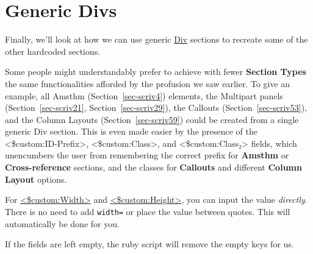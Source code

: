\documentclass[
  12pt,
  a4paper,
  oneside,
  numbers=noenddot,
  titlepage,
  toclink=all,
  toc=bibliography]{scrbook}
\theoremstyle{definition}
\theoremstyle{definition}
\theoremstyle{definition}
\theoremstyle{plain}
\theoremstyle{plain}
\theoremstyle{plain}
\theoremstyle{plain}
\theoremstyle{plain}
\theoremstyle{remark}
\begin{document}
\hypertarget{sec-scriv65}{%
\section{Generic Divs}\label{sec-scriv65}}

Finally, we'll look at how we can use generic \ul{Div} sections to
recreate some of the other hardcoded sections.

Some people might understandably prefer to achieve with fewer
\textbf{Section Types} the same functionalities afforded by the
profusion we saw earlier. To give an example, all Amsthm
(\protect\hypertarget{cite_111}{}{\label{cite_111}Section~\ref{sec-scriv4}})
elements, the Multipart panels
(\protect\hypertarget{cite_112}{}{\label{cite_112}Section~\ref{sec-scriv21}},
\protect\hypertarget{cite_113}{}{\label{cite_113}Section~\ref{sec-scriv29}}),
the Callouts
(\protect\hypertarget{cite_114}{}{\label{cite_114}Section~\ref{sec-scriv53}}),
and the Column Layouts
(\protect\hypertarget{cite_115}{}{\label{cite_115}Section~\ref{sec-scriv59}})
could be created from a single generic Div section. This is even made
easier by the presence of the \textless\$custom:ID-Prefix\textgreater,
\textless\$custom:Class\textgreater, and
\textless\$custom:Class₂\textgreater{} fields, which unencumbers the
user from remembering the correct prefix for \textbf{Amsthm} or
\textbf{Cross-reference} sections, and the classes for \textbf{Callouts}
and different \textbf{Column Layout} options.

\begin{tcolorbox}[enhanced jigsaw, rightrule=.15mm, bottomtitle=1mm, colback=white, toptitle=1mm, left=2mm, colbacktitle=quarto-callout-tip-color!10!white, opacitybacktitle=0.6, opacityback=0, arc=.35mm, leftrule=.75mm, toprule=.15mm, titlerule=0mm, breakable, coltitle=black, bottomrule=.15mm, colframe=quarto-callout-tip-color-frame, title=\textcolor{quarto-callout-tip-color}{\faLightbulb}\hspace{0.5em}{Tip}]

For \ul{\textless\$custom:Width\textgreater{}} and
\ul{\textless\$custom:Height\textgreater{}}, you can input the value
\emph{directly}. There is no need to add \texttt{width=} or place the
value between quotes. This will automatically be done for you.

\end{tcolorbox}

\begin{tcolorbox}[enhanced jigsaw, rightrule=.15mm, bottomtitle=1mm, colback=white, toptitle=1mm, left=2mm, colbacktitle=quarto-callout-note-color!10!white, opacitybacktitle=0.6, opacityback=0, arc=.35mm, leftrule=.75mm, toprule=.15mm, titlerule=0mm, breakable, coltitle=black, bottomrule=.15mm, colframe=quarto-callout-note-color-frame, title=\textcolor{quarto-callout-note-color}{\faInfo}\hspace{0.5em}{Note}]

If the fields are left empty, the ruby script will remove the empty keys
for us.

\end{tcolorbox}
\end{document}
